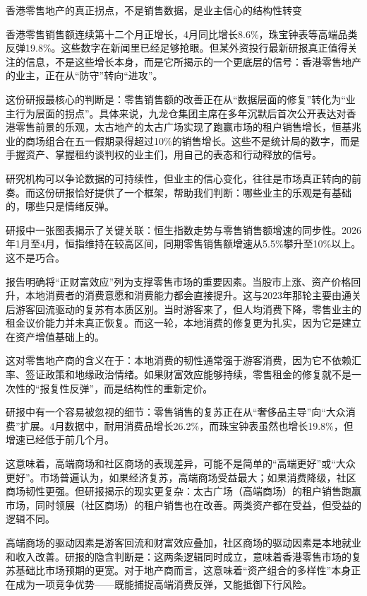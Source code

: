\documentclass[11pt]{ctexart}
\begin{document}
香港零售地产的真正拐点，不是销售数据，是业主信心的结构性转变

香港零售销售额连续第十二个月正增长，4月同比增长8.6\%，珠宝钟表等高端品类反弹19.8\%。这些数字在新闻里已经足够抢眼。但某外资投行最新研报真正值得关注的信息，不是这些增长本身，而是它所揭示的一个更底层的信号：香港零售地产的业主，正在从“防守”转向“进攻”。

这份研报最核心的判断是：零售销售额的改善正在从“数据层面的修复”转化为“业主行为层面的拐点”。具体来说，九龙仓集团主席在多年沉默后首次公开表达对香港零售前景的乐观，太古地产的太古广场实现了跑赢市场的租户销售增长，恒基兆业的商场组合在五一假期录得超过10\%的销售增长。这些不是统计局的数字，而是手握资产、掌握租约谈判权的业主们，用自己的表态和行动释放的信号。

研究机构可以争论数据的可持续性，但业主的信心变化，往往是市场真正转向的前奏。而这份研报恰好提供了一个框架，帮助我们判断：哪些业主的乐观是有基础的，哪些只是情绪反弹。

研报中一张图表揭示了关键关联：恒生指数走势与零售销售额增速的同步性。2026年1月至4月，恒指维持在较高区间，同期零售销售额增速从5.5\%攀升至10\%以上。这不是巧合。

报告明确将“正财富效应”列为支撑零售市场的重要因素。当股市上涨、资产价格回升，本地消费者的消费意愿和消费能力都会直接提升。这与2023年那轮主要由通关后游客回流驱动的复苏有本质区别。当时游客来了，但人均消费下降，零售业主的租金议价能力并未真正恢复。而这一轮，本地消费的修复更为扎实，因为它是建立在资产增值基础上的。

这对零售地产商的含义在于：本地消费的韧性通常强于游客消费，因为它不依赖汇率、签证政策和地缘政治情绪。如果财富效应能够持续，零售租金的修复就不是一次性的“报复性反弹”，而是结构性的重新定价。

研报中有一个容易被忽视的细节：零售销售的复苏正在从“奢侈品主导”向“大众消费”扩展。4月数据中，耐用消费品增长26.2\%，而珠宝钟表虽然也增长19.8\%，但增速已经低于前几个月。

这意味着，高端商场和社区商场的表现差异，可能不是简单的“高端更好”或“大众更好”。市场普遍认为，如果经济复苏，高端商场受益最大；如果消费降级，社区商场韧性更强。但研报揭示的现实更复杂：太古广场（高端商场）的租户销售跑赢市场，同时领展（社区商场）的租户销售也在改善。两类资产都在受益，但受益的逻辑不同。

高端商场的驱动因素是游客回流和财富效应叠加，社区商场的驱动因素是本地就业和收入改善。研报的隐含判断是：这两条逻辑同时成立，意味着香港零售市场的复苏基础比市场预期的更宽。对于地产商而言，这意味着“资产组合的多样性”本身正在成为一项竞争优势——既能捕捉高端消费反弹，又能抵御下行风险。
\end{document}
